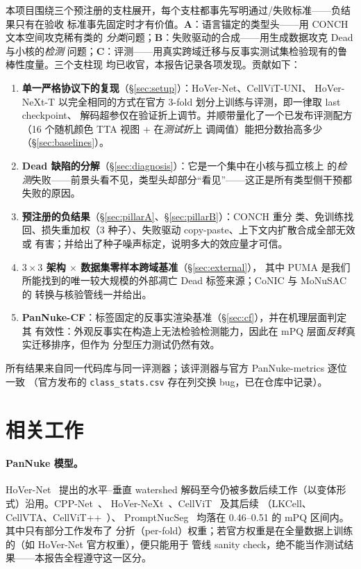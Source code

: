 \documentclass[11pt]{article}
\begin{document}
本项目围绕三个预注册的支柱展开，每个支柱都事先写明通过/失败标准——负结果只有在验收
标准事先固定时才有价值。\textbf{A}：语言锚定的类型头——用 CONCH 文本空间攻克稀有类的
\emph{分类}问题；\textbf{B}：失败驱动的合成——用生成数据攻克 Dead 与小核的\emph{检测}
问题；\textbf{C}：评测——用真实跨域迁移与反事实测试集检验现有的鲁棒性度量。三个支柱现
均已收官，本报告记录各项发现。贡献如下：

\begin{enumerate}
\item \textbf{单一严格协议下的复现}（\S\ref{sec:setup}）：HoVer-Net、CellViT-UNI、
HoVer-NeXt-T 以完全相同的方式在官方 3-fold 划分上训练与评测，即一律取 last checkpoint、
解码超参仅在验证折上调节。并顺带量化了一个已发布评测配方（16 个随机颜色 TTA 视图 + 在\emph{测试折}上
调阈值）能把分数抬高多少（\S\ref{sec:baselines}）。
\item \textbf{Dead 缺陷的分解}（\S\ref{sec:diagnosis}）：它是一个集中在小核与孤立核上
的\emph{检测}失败——前景头看不见，类型头却部分“看见”——这正是所有类型侧干预都失败的原因。
\item \textbf{预注册的负结果}（\S\ref{sec:pillarA}、\S\ref{sec:pillarB}）：CONCH 重分
类、免训练找回、损失重加权（3 种子）、失败驱动 copy-paste、上下文内扩散合成全部无效或
有害；并给出了种子噪声标定，说明多大的效应量才可信。
\item \textbf{$3{\times}3$ 架构 $\times$ 数据集零样本跨域基准}（\S\ref{sec:external}），
其中 PUMA 是我们所能找到的唯一较大规模的外部凋亡 Dead 标签来源；CoNIC 与 MoNuSAC 的
转换与核验管线一并给出。
\item \textbf{PanNuke-CF}：标签固定的反事实渲染基准（\S\ref{sec:cf}），并在机理层面判定其
有效性：外观反事实在构造上无法检验检测能力，因此在 mPQ 层面\emph{反转}真实迁移排序，但作为
分型压力测试仍然有效。
\end{enumerate}

所有结果来自同一代码库与同一评测器；该评测器与官方 PanNuke-metrics 逐位一致
（官方发布的 \texttt{class\_stats.csv} 存在列交换 bug，已在仓库中记录）。

\section{相关工作}
\label{sec:related}

\paragraph{PanNuke 模型。}HoVer-Net~\cite{graham2019hovernet} 提出的水平--垂直
watershed 解码至今仍被多数后续工作（以变体形式）沿用。CPP-Net~\cite{cppnet}、
HoVer-NeXt~\cite{hovenext}、CellViT~\cite{horta2024cellvit} 及其后续
（LKCell、CellVTA、CellViT++~\cite{horta2025cellvitpp}）、
PromptNucSeg~\cite{promptnucseg} 均落在 0.46--0.51 的 mPQ 区间内。其中只有部分工作发布了
分折（per-fold）权重；若官方权重是在全量数据上训练的（如 HoVer-Net 官方权重），便只能用于
管线 sanity check，绝不能当作测试结果——本报告全程遵守这一区分。
\end{document}
